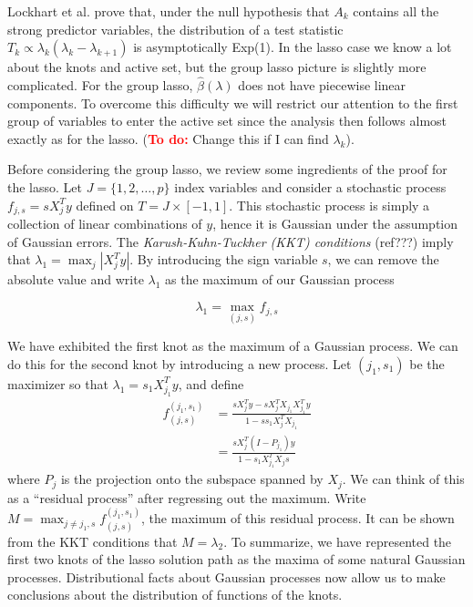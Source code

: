 \documentclass{imsart}
\newcommand{\todo}{\textcolor{red}{\textbf{To do: }}}
\begin{document}
Lockhart et al. prove that, under the null hypothesis that $A_k$
contains all the strong predictor variables, the distribution of a
test statistic $T_k \propto \lambda_k(\lambda_k - \lambda_{k+1})$ is
asymptotically Exp(1). In the lasso case we know a lot about the knots
and active set, but the group lasso picture is slightly more
complicated. For the group lasso, $\hat \beta(\lambda)$ does not have
piecewise linear components. To overcome this difficulty we will
restrict our attention to the first group of variables to enter the
active set since the analysis then follows almost exactly as for the
lasso. (\todo Change this if I can find $\lambda_k$). 

Before considering the group lasso, we review some ingredients of the
proof for the lasso. Let $J = \{ 1, 2, \ldots, p \}$ index variables
and consider a stochastic process $f_{j,s} = sX_j^Ty$ defined on $T =
J \times [ -1, 1 ]$. This stochastic process is simply a collection of
linear combinations of $y$, hence it is Gaussian under the assumption
of Gaussian errors. The \emph{Karush-Kuhn-Tuckher (KKT) conditions}
(ref???) imply that $\lambda_1 = \max_j |X_j^Ty|$. By introducing the
sign variable $s$, we can remove the absolute value and write
$\lambda_1$ as the maximum of our Gaussian process 

\begin{equation}
\lambda_1 = \max_{(j,s)} f_{j,s}
\end{equation}

We have exhibited the first knot as the maximum of a Gaussian
process. We can do this for the second knot by introducing a new
process. Let $(j_1, s_1)$ be the maximizer so that $\lambda_1 =
s_1X_{j_1}^Ty$, and define 
\begin{equation}
\begin{aligned}
  f^{(j_1,s_1)}_{(j,s)} & = \frac{ sX_j^T y - s X_j^T X_{j_1} X_{j_1}^Ty  } { 1 -  ss_1 X_j^TX_{j_1}} \\
  & = \frac{ sX_j^T(I-P_{j_1}) y }{ 1 -  s_1 X_{j_1}^T X_js}
\end{aligned}
\end{equation}
where $P_j$ is the projection onto the subspace spanned by $X_j$. We
can think of this as a ``residual process'' after regressing out the
maximum. Write $M = \max_{j \neq j_1, s} f^{(j_1,s_1)}_{(j,s)}$, the
maximum of this residual process. It can be shown from the KKT
conditions that $M  = \lambda_2$. To summarize, we have represented
the first two knots of the lasso solution path as the maxima of some
natural Gaussian processes. Distributional facts about Gaussian
processes now allow us to make conclusions about the distribution of
functions of the knots. 
\end{document}
